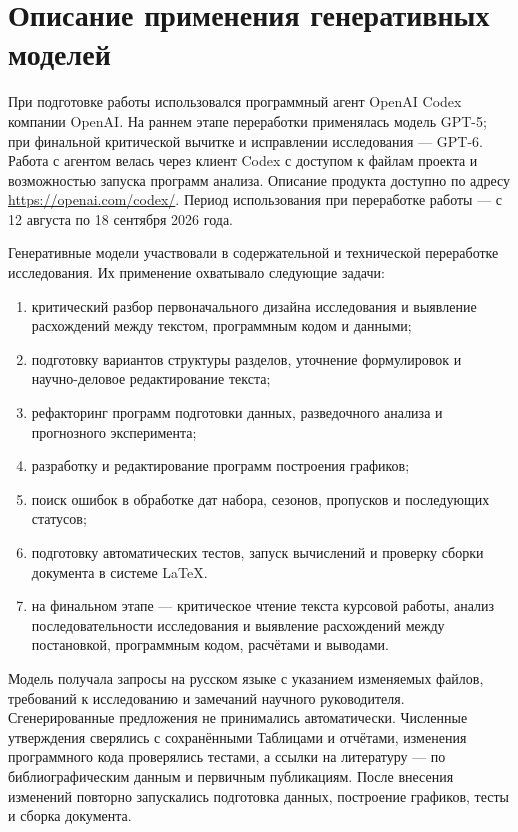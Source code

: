 \clearpage
\section{Описание применения генеративных моделей}
\label{sec:ai-usage}

При подготовке работы использовался программный агент OpenAI Codex компании OpenAI. На раннем этапе переработки применялась модель GPT-5; при финальной критической вычитке и исправлении исследования --- GPT-6. Работа с агентом велась через клиент Codex с доступом к файлам проекта и возможностью запуска программ анализа. Описание продукта доступно по адресу \url{https://openai.com/codex/}. Период использования при переработке работы --- с 12 августа по 18 сентября 2026 года.

Генеративные модели участвовали в содержательной и технической переработке исследования. Их применение охватывало следующие задачи:
\begin{enumerate}
    \item критический разбор первоначального дизайна исследования и выявление расхождений между текстом, программным кодом и данными;
    \item подготовку вариантов структуры разделов, уточнение формулировок и научно-деловое редактирование текста;
    \item рефакторинг программ подготовки данных, разведочного анализа и прогнозного эксперимента;
    \item разработку и редактирование программ построения графиков;
    \item поиск ошибок в обработке дат набора, сезонов, пропусков и последующих статусов;
    \item подготовку автоматических тестов, запуск вычислений и проверку сборки документа в системе \LaTeX.
    \item на финальном этапе --- критическое чтение текста курсовой работы, анализ последовательности исследования и выявление расхождений между постановкой, программным кодом, расчётами и выводами.
\end{enumerate}

Модель получала запросы на русском языке с указанием изменяемых файлов, требований к исследованию и замечаний научного руководителя. Сгенерированные предложения не принимались автоматически. Численные утверждения сверялись с сохранёнными Таблицами и отчётами, изменения программного кода проверялись тестами, а ссылки на литературу --- по библиографическим данным и первичным публикациям. После внесения изменений повторно запускались подготовка данных, построение графиков, тесты и сборка документа.

